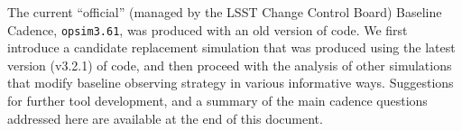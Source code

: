 The current ``official'' (managed by the LSST Change Control Board)
Baseline Cadence, \texttt{opsim3.61},  was produced with an old version of
\OpSim code. We first introduce a candidate replacement simulation
that was produced using  the latest version (v3.2.1) of \OpSim code,
and then proceed with the analysis of other simulations that modify baseline
observing strategy in various informative ways. Suggestions for
further tool development, and a summary of the main cadence questions
addressed here are available at the end of this document.





